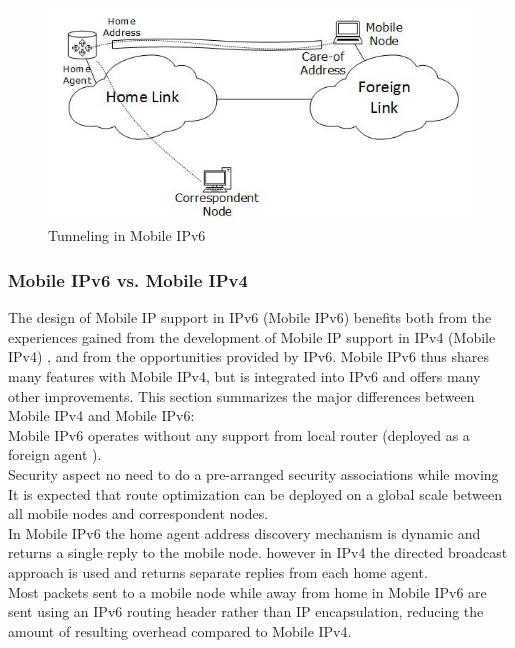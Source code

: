 \documentclass{article}
\begin{document}
\begin{figure}[h!]
  \centering
    \includegraphics[scale=0.5]{reportPictures/figure2.png}
  \caption{Tunneling in Mobile IPv6}
\end{figure}

\subsubsection{Mobile IPv6 vs. Mobile IPv4}


The design of Mobile IP support in IPv6 (Mobile IPv6) benefits both
from the experiences gained from the development of Mobile IP support
in IPv4 (Mobile IPv4) , and from the opportunities provided by IPv6.
Mobile IPv6 thus shares many features with Mobile IPv4, but is
integrated into IPv6 and offers many other improvements. This section
summarizes the major differences between Mobile IPv4 and Mobile IPv6:\\
\newline
Mobile IPv6 operates without any support from local router (deployed
as a foreign agent ).\\
\newline
Security aspect no need to do a pre-arranged
security associations while moving It is expected that route
optimization can be deployed on a global scale between all mobile
nodes and correspondent nodes.\\
\newline
In Mobile IPv6 the home agent address discovery mechanism is dynamic
and returns a single reply to the mobile node. however in IPv4 the
directed broadcast approach is used and returns separate replies from
each home agent.\\
\newline
Most packets sent to a mobile node while away from home in Mobile IPv6
are sent using an IPv6 routing header rather than IP encapsulation,
reducing the amount of resulting overhead compared to Mobile IPv4.
\end{document}
